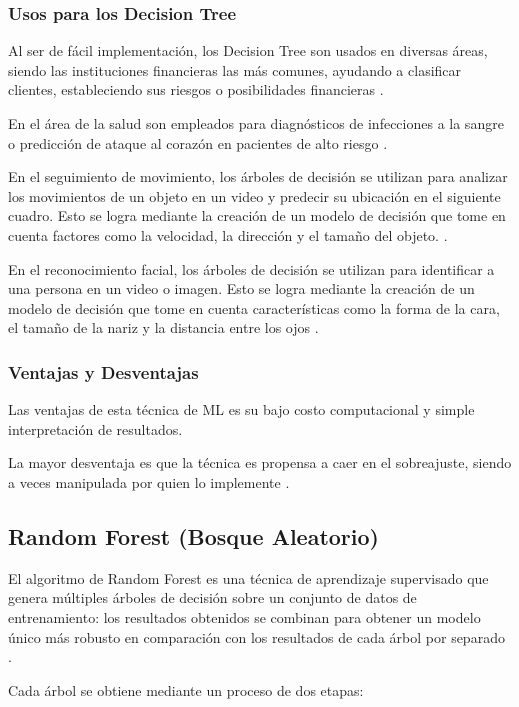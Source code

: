 \subsubsection{Usos para los Decision Tree}
Al ser de fácil implementación, los Decision Tree son usados en diversas áreas, siendo las instituciones financieras las más comunes, ayudando a clasificar clientes, estableciendo sus riesgos o posibilidades financieras \cite{Harrington2012}.\\
\par En el área de la salud son empleados para diagnósticos de infecciones a la sangre o predicción de ataque al corazón en pacientes de alto riesgo \cite{Harrington2012}.\\
\par En el seguimiento de movimiento, los árboles de decisión se utilizan para analizar los movimientos de un objeto en un video y predecir su ubicación en el siguiente cuadro. Esto se logra mediante la creación de un modelo de decisión que tome en cuenta factores como la velocidad, la dirección y el tamaño del objeto. \cite{Harrington2012}.\\
\par En el reconocimiento facial, los árboles de decisión se utilizan para identificar a una persona en un video o imagen. Esto se logra mediante la creación de un modelo de decisión que tome en cuenta características como la forma de la cara, el tamaño de la nariz y la distancia entre los ojos \cite{Harrington2012}.\\

\doublespacing
\subsubsection{Ventajas y Desventajas}
Las ventajas de esta técnica de ML es su bajo costo computacional y simple interpretación de resultados. \\
\par La mayor desventaja es que la técnica es propensa a caer en el sobreajuste, siendo a veces manipulada por quien lo implemente \cite{Harrington2012}.\\

\doublespacing
\subsection{Random Forest (Bosque Aleatorio)}
El algoritmo de Random Forest es una técnica de aprendizaje supervisado que genera múltiples árboles de decisión sobre un conjunto de datos de entrenamiento: los resultados obtenidos se combinan para obtener un modelo único más robusto en comparación con los resultados de cada árbol por separado \cite{breiman2001random}.\\
\par Cada árbol se obtiene mediante un proceso de dos etapas:

